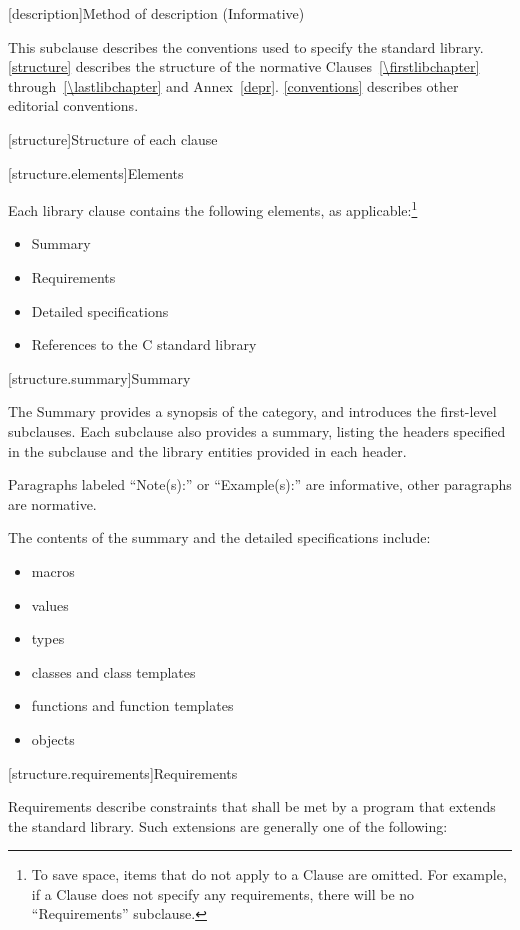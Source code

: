 [description]{Method of description (Informative)}

\pnum
This subclause describes the conventions used to specify the \Cpp standard
library. \ref{structure} describes the structure of the normative
Clauses~\ref{\firstlibchapter} through~\ref{\lastlibchapter} and
Annex~\ref{depr}. \ref{conventions} describes other editorial conventions.

[structure]{Structure of each clause}

[structure.elements]{Elements}

\pnum
Each library clause contains the following elements, as applicable:\footnote{To
save space, items that do not apply to a Clause are omitted.
For example, if a Clause does not specify any requirements,
there will be no ``Requirements'' subclause.}

\begin{itemize}
\item Summary
\item Requirements
\item Detailed specifications
\item References to the C standard library
\end{itemize}

[structure.summary]{Summary}

\pnum
The Summary provides a synopsis of the category, and introduces the first-level subclauses.
Each subclause also provides a summary, listing the headers specified in the
subclause and the library entities provided in each header.

\pnum
Paragraphs labeled ``Note(s):'' or ``Example(s):'' are informative, other paragraphs
are normative.

\pnum
The contents of the summary and the detailed specifications include:

\begin{itemize}
\item macros
\item values
\item types
\item classes and class templates
\item functions and function templates
\item objects
\end{itemize}

[structure.requirements]{Requirements}

\pnum
{}%
Requirements describe constraints that shall be met by a \Cpp program that extends the standard library.
Such extensions are generally one of the following:

